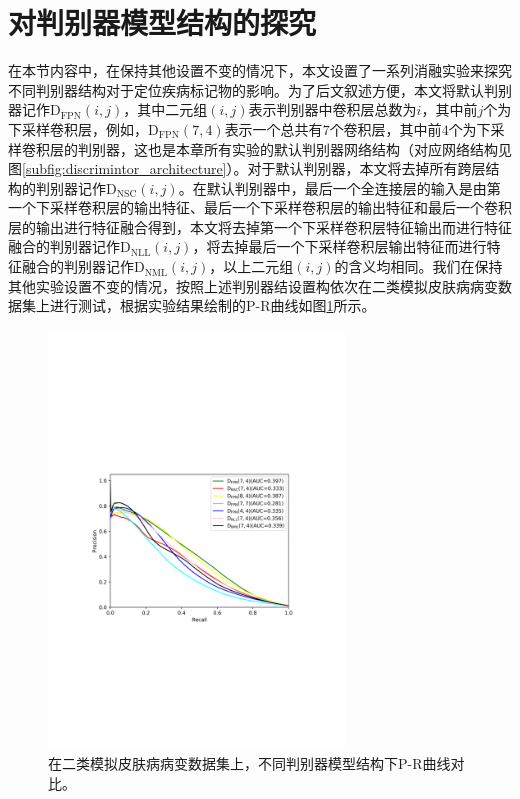 \section{对判别器模型结构的探究}\label{sec:dis_arch}
在本节内容中，在保持其他设置不变的情况下，本文设置了一系列消融实验来探究不同判别器结构对于定位疾病标记物的影响。为了后文叙述方便，本文将默认判别器记作$\mathrm{D}_\mathrm{FPN}(i,j)$，其中二元组$(i,j)$表示判别器中卷积层总数为$i$，其中前$j$个为下采样卷积层，例如，$\mathrm{D}_\mathrm{FPN}(7,4)$表示一个总共有$7$个卷积层，其中前$4$个为下采样卷积层的判别器，这也是本章所有实验的默认判别器网络结构（对应网络结构见图\ref{subfig:discrimintor_architecture}）。对于默认判别器，本文将去掉所有跨层结构的判别器记作$\mathrm{D}_\mathrm{NSC}(i,j)$。在默认判别器中，最后一个全连接层的输入是由第一个下采样卷积层的输出特征、最后一个下采样卷积层的输出特征和最后一个卷积层的输出进行特征融合得到，本文将去掉第一个下采样卷积层特征输出而进行特征融合的判别器记作$\mathrm{D}_\mathrm{NLL}(i,j)$，将去掉最后一个下采样卷积层输出特征而进行特征融合的判别器记作$\mathrm{D}_\mathrm{NML}(i,j)$，以上二元组$(i,j)$的含义均相同。我们在保持其他实验设置不变的情况，按照上述判别器结设置构依次在二类模拟皮肤病病变数据集上进行测试，根据实验结果绘制的P-R曲线如图\ref{fig:pr_curve_skin_dis_arch}所示。
\begin{figure}[h]
	\centering
	\includegraphics[width=0.7\textwidth]{figure/pr_curve_dis_arch/pr_curve.pdf}
	\caption[不同判别器模型结构下P-R曲线对比]{在二类模拟皮肤病病变数据集上，不同判别器模型结构下P-R曲线对比。} 
	\label{fig:pr_curve_skin_dis_arch}
\end{figure}

